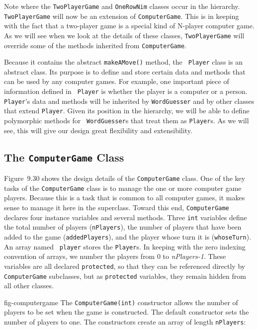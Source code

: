 Note where the {\tt TwoPlayerGame} and {\tt OneRowNim} classes occur
in the hierarchy.  {\tt TwoPlayerGame} will now be an extension of
{\tt ComputerGame}. This is in keeping with the fact that a two-player
game is a special kind of N-player computer game.  As we will see when
we look at the details of these classes, {\tt TwoPlayerGame} will
override some of the methods inherited from {\tt ComputerGame}.

Because it contains the abstract {\tt makeAMove()} method, the {\tt
Player} class is an abstract class.  Its purpose is to define and
store certain data and methods that can be used by any computer
games. For example, one important piece of information defined in {\tt
Player} is whether the player is a computer or a person.  {\tt
Player}'s data and methods will be inherited by {\tt WordGuesser} and
by other classes that extend {\tt Player}.  Given its position in the
hierarchy, we will be able to define polymorphic methods for {\tt
WordGuesser}s that treat them as {\tt Player}s. As we will see, this
will give our design great flexibility and extensibility.

\subsection{The {\tt ComputerGame} Class}

Figure~9.30 shows the design details of the {\tt ComputerGame}
class. One of the key tasks of the {\tt ComputerGame} class is to
manage the one or more computer game players. Because this is a task
that is common to all computer games, it makes sense to manage it here
in the superclass. Toward this end, {\tt ComputerGame} declares four
instance variables and several methods. Three {\tt int} variables
define the total number of players ({\tt nPlayers}), the number of
players that have been added to the game ({\tt addedPlayers}), and the
player whose turn it is ({\tt whoseTurn}).  An array named {\tt
player} stores the {\tt Player}s.  In keeping with the zero indexing
convention of arrays, we number the players from 0 to {\em
nPlayers-1}. These variables are all declared {\tt protected}, so that
they can be referenced directly by {\tt ComputerGame} subclasses, but
as {\tt protected} variables, they remain hidden from all other
classes.

{fig-computergame}
The {\tt ComputerGame(int)} constructor allows the number of players
to be set when the game is constructed.  The default constructor sets
the number of players to one. The constructors create an array of
length {\tt nPlayers}:

